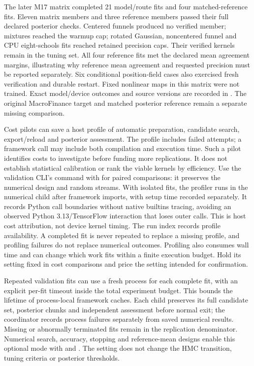 The later M17 matrix completed 21 model/route fits and four matched-reference
fits. Eleven matrix members and three reference members passed their full
declared posterior checks. Centered funnels produced no verified member;
mixtures reached the warmup cap; rotated Gaussian, noncentered funnel and CPU
eight-schools fits reached retained precision caps. Their verified kernels
remain in the tuning set. All four reference fits met the declared mean
agreement margins, illustrating why reference mean agreement and requested
precision must be reported separately. Six conditional position-field cases
also exercised fresh verification and durable restart. Fixed nonlinear maps
in this matrix were not trained. Exact model/device outcomes and source versions
are recorded in .
The original MacroFinance target and matched posterior reference remain a
separate missing comparison.

Cost pilots can save a host profile of automatic preparation, candidate search,
export/reload and posterior assessment. The profile includes failed attempts;
a framework call may include both compilation and execution time. Such a pilot
identifies costs to investigate before funding more replications. It does not
establish statistical calibration or rank the viable kernels by efficiency.
Use the validation CLI's  command with  for paired
comparisons: it preserves the numerical design and random streams. With
isolated fits, the profiler runs in the numerical child after framework
imports, with setup time recorded separately. It records Python call boundaries
without native builtins tracing, avoiding an observed Python 3.13/TensorFlow
interaction that loses outer calls. This is host cost attribution, not device
kernel timing. The run index records profile availability. A completed fit is
never repeated to replace a missing profile, and profiling failures do not
replace numerical outcomes.
Profiling also consumes wall time and can change which work fits within a
finite execution budget. Hold its setting fixed in cost comparisons and price
the setting intended for confirmation.

Repeated validation fits can use a fresh process for each complete fit, with
an explicit per-fit timeout inside the total experiment budget. This bounds
the lifetime of process-local framework caches. Each child preserves its full
candidate set, posterior chunks and independent assessment before normal exit;
the coordinator records process failures separately from saved numerical
results. Missing or abnormally terminated fits remain in the replication
denominator. Numerical search, accuracy, stopping and reference-mean designs enable this
optional mode with  and
. The setting does not change the
HMC transition, tuning criteria or posterior thresholds.

